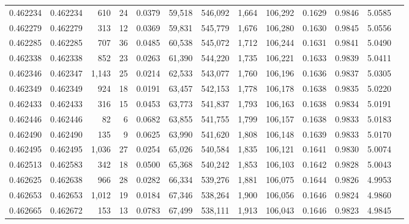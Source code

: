 \begin{tabular}{rrrrrrrrrrrrr}
0.462234 & 0.462234 &   610 &    24 &                                     0.0379 &  59,518 & 546,092 &   1,664 & 106,292 & 0.1629 & 0.9846 & 5.0585 \\
0.462279 & 0.462279 &   313 &    12 &                                     0.0369 &  59,831 & 545,779 &   1,676 & 106,280 & 0.1630 & 0.9845 & 5.0556 \\
0.462285 & 0.462285 &   707 &    36 &                                     0.0485 &  60,538 & 545,072 &   1,712 & 106,244 & 0.1631 & 0.9841 & 5.0490 \\
0.462338 & 0.462338 &   852 &    23 &                                     0.0263 &  61,390 & 544,220 &   1,735 & 106,221 & 0.1633 & 0.9839 & 5.0411 \\
0.462346 & 0.462347 & 1,143 &    25 &                                     0.0214 &  62,533 & 543,077 &   1,760 & 106,196 & 0.1636 & 0.9837 & 5.0305 \\
0.462349 & 0.462349 &   924 &    18 &                                     0.0191 &  63,457 & 542,153 &   1,778 & 106,178 & 0.1638 & 0.9835 & 5.0220 \\
0.462433 & 0.462433 &   316 &    15 &                                     0.0453 &  63,773 & 541,837 &   1,793 & 106,163 & 0.1638 & 0.9834 & 5.0191 \\
0.462446 & 0.462446 &    82 &     6 &                                     0.0682 &  63,855 & 541,755 &   1,799 & 106,157 & 0.1638 & 0.9833 & 5.0183 \\
0.462490 & 0.462490 &   135 &     9 &                                     0.0625 &  63,990 & 541,620 &   1,808 & 106,148 & 0.1639 & 0.9833 & 5.0170 \\
0.462495 & 0.462495 & 1,036 &    27 &                                     0.0254 &  65,026 & 540,584 &   1,835 & 106,121 & 0.1641 & 0.9830 & 5.0074 \\
0.462513 & 0.462583 &   342 &    18 &                                     0.0500 &  65,368 & 540,242 &   1,853 & 106,103 & 0.1642 & 0.9828 & 5.0043 \\
0.462625 & 0.462638 &   966 &    28 &                                     0.0282 &  66,334 & 539,276 &   1,881 & 106,075 & 0.1644 & 0.9826 & 4.9953 \\
0.462653 & 0.462653 & 1,012 &    19 &                                     0.0184 &  67,346 & 538,264 &   1,900 & 106,056 & 0.1646 & 0.9824 & 4.9860 \\
0.462665 & 0.462672 &   153 &    13 &                                     0.0783 &  67,499 & 538,111 &   1,913 & 106,043 & 0.1646 & 0.9823 & 4.9845 \\

\end{tabular}
